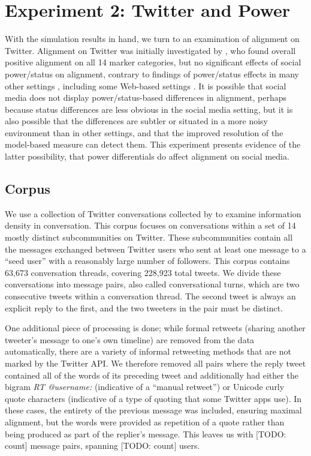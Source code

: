 \documentclass{acm_proc_article-sp}
\begin{document}
\section{Experiment 2: Twitter and Power}
With the simulation results in hand, we turn to an examination of alignment on Twitter.  Alignment on Twitter was initially investigated by \cite{DNMGamonDumais2011}, who found overall positive alignment on all 14 marker categories, but no significant effects of social power/status on alignment, contrary to findings of power/status effects in many other settings \cite{Gnisci2005}, including some Web-based settings \cite{DNMEtAl2012,NobleFernandez2015}.  It is possible that social media does not display power/status-based differences in alignment, perhaps because status differences are less obvious in the social media setting, but it is also possible that the differences are subtler or situated in a more noisy environment than in other settings, and that the improved resolution of the model-based measure can detect them.  This experiment presents evidence of the latter possibility, that power differentials do affect alignment on social media.

\subsection{Corpus}
We use a collection of Twitter conversations collected by \cite{DoyleFrank2015CMCL} to examine information density in conversation. This corpus focuses on conversations within a set of 14 mostly distinct subcommunities on Twitter.  These subcommunities contain all the messages exchanged between Twitter users who sent at least one message to a ``seed user'' with a reasonably large number of followers. This corpus contains 63,673 conversation threads, covering 228,923 total tweets.  We divide these conversations into message pairs, also called conversational turns, which are two consecutive tweets within a conversation thread.  The second tweet is always an explicit reply to the first, and the two tweeters in the pair must be distinct.  

One additional piece of processing is done; while formal retweets (sharing another tweeter's message to one's own timeline) are removed from the data automatically, there are a variety of informal retweeting methods that are not marked by the Twitter API.  We therefore removed all pairs where the reply tweet contained all of the words of its preceding tweet and additionally had either the bigram \textit{RT @username:} (indicative of a ``manual retweet'') or Unicode curly quote characters (indicative of a type of quoting that some Twitter apps use).  In these cases, the entirety of the previous message was included, ensuring maximal alignment, but the words were provided as repetition of a quote rather than being produced as part of the replier's message.  This leaves us with [TODO: count] message pairs, spanning [TODO: count] users.
\end{document}
